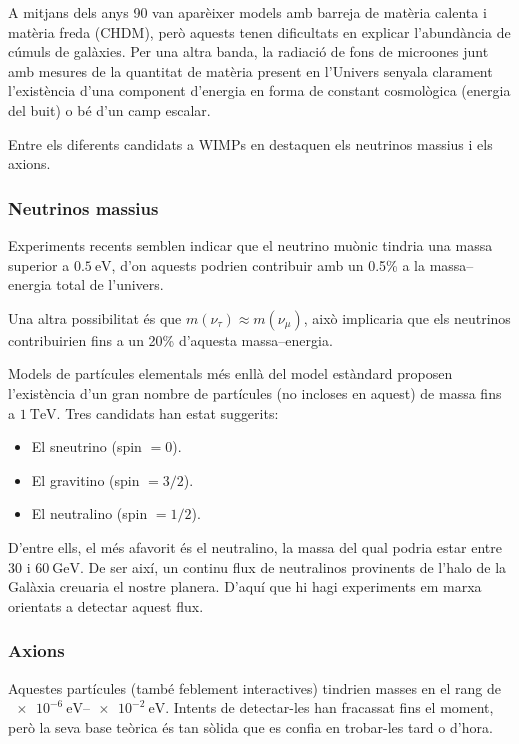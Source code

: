 A mitjans dels anys 90 van aparèixer models amb barreja de matèria calenta i matèria freda (CHDM), però aquests tenen dificultats en explicar l'abundància de cúmuls de galàxies. Per una altra banda, la radiació de fons de microones junt amb mesures de la quantitat de matèria present en l'Univers senyala clarament l'existència d'una component d'energia en forma de constant cosmològica (energia del buit) o bé d'un camp escalar.

Entre els diferents candidats a WIMPs en destaquen els neutrinos massius i els axions.

\subsubsection*{Neutrinos massius}
Experiments recents semblen indicar que el neutrino muònic tindria una massa superior a $\SI{0.5}{\eV}$, d'on aquests podrien contribuir amb un 0.5\% a la massa--energia total de l'univers.

Una altra possibilitat és que $m(\nu_{\tau}) \approx m(\nu_{\mu})$, això implicaria que els neutrinos contribuirien fins a un 20\% d'aquesta massa--energia.

Models de partícules elementals més enllà del model estàndard proposen l'existència d'un gran nombre de partícules (no incloses en aquest) de massa fins a $\SI{1}{\tera\eV}$. Tres candidats han estat suggerits:
\begin{itemize}
	\item El sneutrino (spin $= 0$).
	\item El gravitino (spin $= 3/2$).
	\item El neutralino (spin $= 1/2$).
\end{itemize}
D'entre ells, el més afavorit és el neutralino, la massa del qual podria estar entre $30$ i $\SI{60}{\giga\eV}$. De ser així, un continu flux de neutralinos provinents de l'halo de la Galàxia creuaria el nostre planera. D'aquí que hi hagi experiments em marxa orientats a detectar aquest flux.

\subsubsection*{Axions}
Aquestes partícules (també feblement interactives) tindrien masses en el rang de $\SIrange{e-6}{e-2}{\eV}$. Intents de detectar-les han fracassat fins el moment, però la seva base teòrica és tan sòlida que es confia en trobar-les tard o d'hora.

